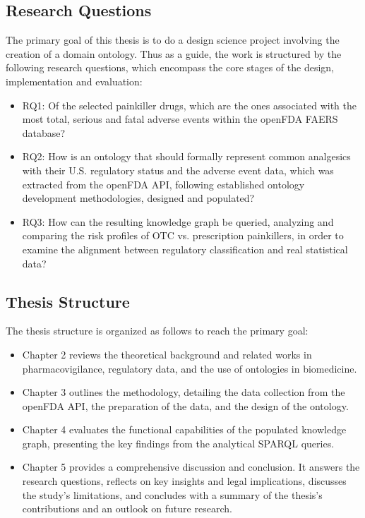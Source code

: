 \subsection{Research Questions}
The primary goal of this thesis is to do a design science project involving the creation of a domain ontology. Thus as a guide, the work is structured by the following research questions, which encompass the core stages of the design, implementation and evaluation:
\begin{itemize}
    \item RQ1: Of the selected painkiller drugs, which are the ones associated with the most total, serious and fatal adverse events within the openFDA FAERS database?
    \item RQ2: How is an ontology that should formally represent common analgesics with their U.S. regulatory status and the adverse event data, which was extracted from the openFDA API, following established ontology development methodologies, designed and populated?
    \item RQ3: How can the resulting knowledge graph be queried, analyzing and comparing the risk profiles of OTC vs. prescription painkillers, in order to examine the alignment between regulatory classification and real statistical data?
\end{itemize}
\subsection{Thesis Structure}
The thesis structure is organized as follows to reach the primary goal:
\begin{itemize}
    \item Chapter 2 reviews the theoretical background and related works in pharmacovigilance, regulatory data, and the use of ontologies in biomedicine.
    \item Chapter 3 outlines the methodology, detailing the data collection from the openFDA API, the preparation of the data, and the design of the ontology.
    \item Chapter 4 evaluates the functional capabilities of the populated knowledge graph, presenting the key findings from the analytical SPARQL queries.
    \item Chapter 5 provides a comprehensive discussion and conclusion. It answers the research questions, reflects on key insights and legal implications, discusses the study's limitations, and concludes with a summary of the thesis's contributions and an outlook on future research. 
\end{itemize}
